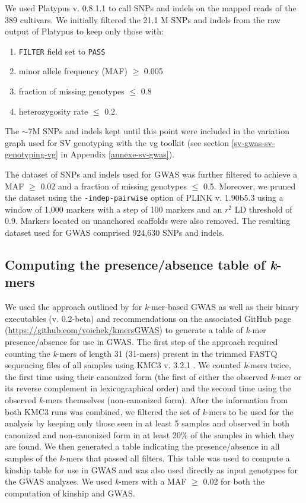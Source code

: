 We used Platypus v. 0.8.1.1 \citep{rimmer2014} to call SNPs and indels on the
mapped reads of the 389 cultivars. We initially filtered the 21.1 M SNPs and
indels from the raw output of Platypus to keep only those with:

\begin{enumerate}
	\item \texttt{FILTER} field set to \texttt{PASS}
	\item minor allele frequency (MAF) $\geq$ 0.005
	\item fraction of missing genotypes $\leq$ 0.8
	\item heterozygosity rate $\leq$ 0.2.
\end{enumerate}

The $\sim$7M SNPs and indels kept until this point were included in
the variation graph used for SV genotyping with the vg toolkit (see section
\ref{sv-gwas-sv-genotyping-vg} in Appendix \ref{annexe-sv-gwas}).

The dataset of SNPs and indels used for GWAS was further filtered to achieve a
MAF $\geq$ 0.02 and a fraction of missing genotypes $\leq$ 0.5. Moreover, we
pruned the dataset using the \texttt{-\-indep-pairwise} option of PLINK v.
1.90b5.3 \citep{purcell2007} using a window of 1,000 markers with a step of 100
markers and an $r^2$ LD threshold of 0.9. Markers located on unanchored
scaffolds were also removed. The resulting dataset used for GWAS comprised
924,630 SNPs and indels.

\subsection{Computing the presence/absence table of \emph{k}-mers}
\label{sv-gwas-kmer-pav}

We used the approach outlined by \cite{voichek2020} for \emph{k}-mer-based GWAS
as well as their binary executables (v. 0.2-beta) and recommendations on the
associated GitHub page (\url{https://github.com/voichek/kmersGWAS}) to generate
a table of \emph{k}-mer presence/absence for use in GWAS.  The first step of
the approach required counting the \emph{k}-mers of length 31 (31-mers) present
in the trimmed FASTQ sequencing files of all samples using KMC3 v. 3.2.1
\citep{kokot2017}. We counted \emph{k}-mers twice, the first time using their
canonized form (the first of either the observed \textit{k}-mer or its reverse
complement in lexicographical order) and the second time using the observed
\emph{k}-mers themselves (non-canonized form). After the information from both KMC3 runs was
combined, we filtered the set of \emph{k}-mers to be used for the analysis by
keeping only those seen in at least 5 samples and observed in both canonized
and non-canonized form in at least 20\% of the samples in which they are found.
We then generated a table indicating the presence/absence in all samples of the
\emph{k}-mers that passed all filters. This table was used to compute a kinship
table for use in GWAS and was also used directly as input genotypes for the
GWAS analyses. We used \emph{k}-mers with a MAF $\geq$ 0.02 for both the
computation of kinship and GWAS.

